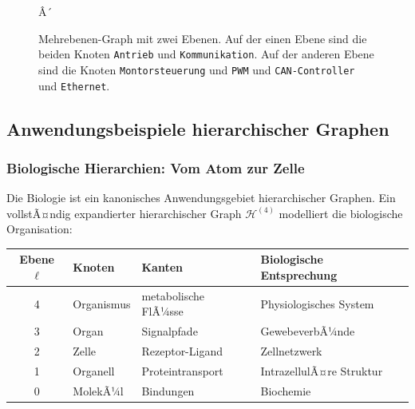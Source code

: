 ﻿\documentclass[12pt,a4paper,twoside]{article}
\theoremstyle{definition}
\theoremstyle{plain}
\theoremstyle{remark}
\begin{document}
\begin{figure}[h]
	\centering
	\caption{Mehrebenen-Graph mit zwei Ebenen. Auf der einen Ebene sind die beiden Knoten \texttt{Antrieb} und \texttt{Kommunikation}. Auf der anderen Ebene sind die Knoten \texttt{Montorsteuerung} und \texttt{PWM} und \texttt{CAN-Controller} und \texttt{Ethernet}.}Â´
	\label{fig:interlevel}
\end{figure}

\subsection{Anwendungsbeispiele hierarchischer Graphen}
\label{sub:anwendungen_hierarchie}

\subsubsection{Biologische Hierarchien: Vom Atom zur Zelle}

Die Biologie ist ein kanonisches Anwendungsgebiet hierarchischer
Graphen.  Ein vollstÃ¤ndig expandierter hierarchischer Graph
$\mathcal{H}^{(4)}$ modelliert die biologische Organisation:

\begin{center}
	\begin{tabular}{clll}
		\toprule
		Ebene $\ell$ & Knoten & Kanten & Biologische Entsprechung \\
		\midrule
		4 & Organismus & metabolische FlÃ¼sse & Physiologisches System \\
		3 & Organ      & Signalpfade         & GewebeverbÃ¼nde         \\
		2 & Zelle      & Rezeptor-Ligand     & Zellnetzwerk           \\
		1 & Organell   & Proteintransport    & IntrazellulÃ¤re Struktur \\
		0 & MolekÃ¼l    & Bindungen           & Biochemie              \\
		\bottomrule
	\end{tabular}
\end{center}
\end{document}
